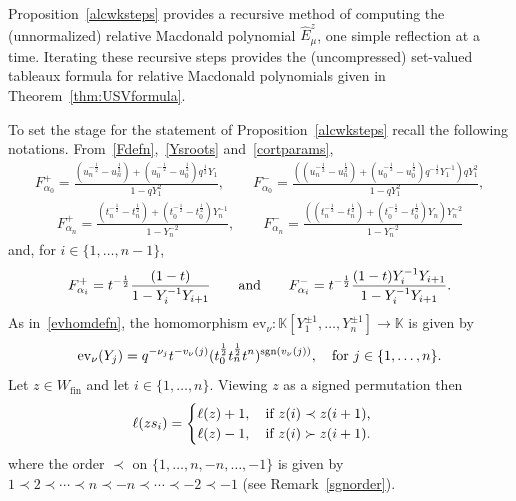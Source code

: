 \documentclass[11pt]{article}
\theoremstyle{plain}
\theoremstyle{definition}
\theoremstyle{remark}
\numberwithin{equation}{section}
\def\KK{\mathbb{K}}
\def\ev{\mathrm{ev}}
\newcounter{r}
\newcounter{s}
\begin{document}
Proposition~\ref{alcwksteps} provides a recursive method of computing the (unnormalized) relative Macdonald polynomial
$\widehat{E}^z_\mu$, one simple reflection at a time.
Iterating these recursive steps provides the (uncompressed) set-valued tableaux formula for relative Macdonald polynomials given in Theorem~\ref{thm:USVformula}.

To set the stage for the statement of Proposition~\ref{alcwksteps} recall the following notations.
From~\eqref{Fdefn},~\eqref{Ysroots} and~\eqref{cortparams},
\begin{align*}
F^+_{\alpha_0}
=
\frac{(u_n^{-\frac12}-u_n^{\frac12})
+(u_0^{-\frac12}-u_0^{\frac12}) q^{\frac12}Y_1 }
{1-qY_1^2 },
\qquad
F^-_{\alpha_0}
=
\frac{((u_n^{-\frac12}-u_n^{\frac12})
+(u_0^{-\frac12}-u_0^{\frac12}) q^{-\frac12}Y_1^{-1}) qY_1^2 }
{1- q Y_1^2 },
\end{align*}
\begin{align*}
F^+_{\alpha_n}
=\frac{(t_n^{-\frac12}-t_n^{\frac12})+(t_0^{-\frac12}-t_0^{\frac12})Y_n^{-1} }
{1-Y_n^{-2}},
\qquad
F^-_{\alpha_n}
=\frac{( (t_n^{-\frac12}-t_n^{\frac12})+(t_0^{-\frac12}-t_0^{\frac12})Y_n)Y_n^{-2} }
{1-Y_n^{-2}}
\end{align*}
and, for $i\in \{1, \ldots, n-1\}$,
$$F^+_{\alpha_i} = t^{-\frac12}\frac{(1-t)} {1-Y_i^{-1}Y_{i+1}}
\qquad\hbox{and}\qquad
F^-_{\alpha_i} = t^{-\frac12}\frac{(1-t)Y_i^{-1}Y_{i+1}} {1-Y_i^{-1}Y_{i+1}}.
$$
As in~\eqref{evhomdefn}, 
the homomorphism
$\ev_\nu\colon \KK[Y_1^{\pm1}, \ldots, Y_n^{\pm1}] \longrightarrow  \KK$ is given by
\begin{equation*}
\ev_\nu(Y_j) = q^{-\nu_j}t^{-v_\nu(j)} (t^{\frac12}_0t^{\frac12}_n t^n)^{\mathrm{sgn}(v_\nu(j))},
\quad\hbox{for $j\in \{1, \ldots, n\}$.}
\end{equation*}
Let $z\in W_{\mathrm{fin}}$ and let $i\in \{1, \ldots, n\}$.  Viewing $z$ as a signed permutation then
$$\ell(zs_i)=\begin{cases}
\ell(z)+1, \quad\hbox{if $z(i) \prec z(i+1)$,} \\
\ell(z)-1, \quad\hbox{if $z(i) \succ z(i+1)$.}
\end{cases}
$$
where the order $\prec$ on $\{1, \ldots, n, -n, \ldots, -1\}$ is given by 
$1\prec 2\prec \cdots \prec n \prec -n \prec \cdots \prec -2 \prec -1$ (see Remark~\ref{sgnorder}).
\end{document}
